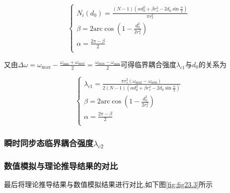 \documentclass{article}
\begin{document}
$$
\begin{cases}
	N_i\left( d_0 \right) =\frac{\left( N-1 \right) \left( \alpha d_{0}^{2}+\beta r_{s}^{2}-2d_0\sin \frac{\alpha}{2} \right)}{\pi r_{s}^{2}}\\
	\beta =2\mathrm{arc}\cos \left( 1-\frac{d_{0}^{2}}{2r_{s}^{2}} \right)\\
	\alpha =\frac{2\pi -\beta}{2}\\
\end{cases}
$$

又由$\Delta \omega =\omega _{\max}-\frac{\omega _{\min}+\omega _{\max}}{2}=\frac{\omega _{\max}-\omega _{\min}}{2}$可得临界耦合强度$\lambda _{c1}$与$d_0$的关系为

$$
\begin{cases}
	\lambda _{c1}=\frac{\pi r_{s}^{2}\left( \omega _{\max}-\omega _{\min} \right)}{2\left( N-1 \right) \left( \alpha d_{0}^{2}+\beta r_{s}^{2}-2d_0\sin \frac{\alpha}{2} \right)}\\
	\beta =2\mathrm{arc}\cos \left( 1-\frac{d_{0}^{2}}{2r_{s}^{2}} \right)\\
	\alpha =\frac{2\pi -\beta}{2}\\
\end{cases}
$$

\subsubsection{瞬时同步态临界耦合强度$\lambda_{c2}$}

\subsubsection{数值模拟与理论推导结果的对比}

最后将理论推导结果与数值模拟结果进行对比,如下图\ref{fig:fig23.3}所示
\end{document}
